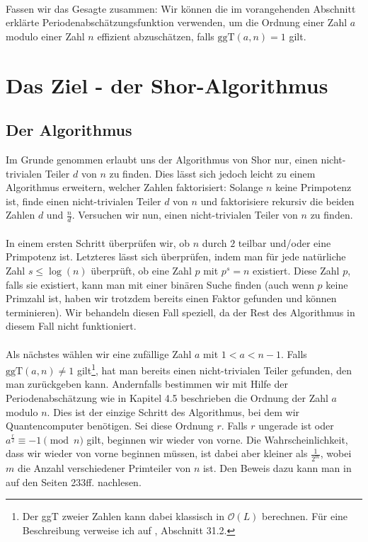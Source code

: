 \paragraph{}
Fassen wir das Gesagte zusammen: Wir können die im vorangehenden Abschnitt erklärte Periodenabschätzungsfunktion verwenden, um die Ordnung einer Zahl $a$ modulo einer Zahl $n$ effizient abzuschätzen, falls $\text{ggT}(a, n) = 1$ gilt.

\section{Das Ziel - der Shor-Algorithmus}
\subsection{Der Algorithmus}
Im Grunde genommen erlaubt uns der Algorithmus von Shor nur, einen nicht-trivialen Teiler $d$ von $n$ zu finden. Dies lässt sich jedoch leicht zu einem Algorithmus erweitern, welcher Zahlen faktorisiert: Solange $n$ keine Primpotenz ist, finde einen nicht-trivialen Teiler $d$ von $n$ und faktorisiere rekursiv die beiden Zahlen $d$ und $\frac{n}{d}$. Versuchen wir nun, einen nicht-trivialen Teiler von $n$ zu finden.

\paragraph{}
In einem ersten Schritt überprüfen wir, ob $n$ durch $2$ teilbar und/oder eine Primpotenz ist. Letzteres lässt sich überprüfen, indem man für jede natürliche Zahl $s \leq \log(n)$ überprüft, ob eine Zahl $p$ mit $p^s = n$ existiert. Diese Zahl $p$, falls sie existiert, kann man mit einer binären Suche finden (auch wenn $p$ keine Primzahl ist, haben wir trotzdem bereits einen Faktor gefunden und können terminieren). Wir behandeln diesen Fall speziell, da der Rest des Algorithmus in diesem Fall nicht funktioniert.
\paragraph{}
Als nächstes wählen wir eine zufällige Zahl $a$ mit $1 < a < n - 1$. Falls $\text{ggT}(a, n) \neq 1$ gilt\footnote{Der ggT zweier Zahlen kann dabei klassisch in $\mathcal O(L)$ berechnen. Für eine Beschreibung verweise ich auf \cite{clrs}, Abschnitt 31.2.}, hat man bereits einen nicht-trivialen Teiler gefunden, den man zurückgeben kann. Andernfalls bestimmen wir mit Hilfe der Periodenabschätzung wie in Kapitel 4.5 beschrieben die Ordnung der Zahl $a$ modulo $n$. Dies ist der einzige Schritt des Algorithmus, bei dem wir Quantencomputer benötigen. Sei diese Ordnung $r$. Falls $r$ ungerade ist oder $a^\frac{r}{2} \equiv -1 \pmod{n}$ gilt, beginnen wir wieder von vorne. Die Wahrscheinlichkeit, dass wir wieder von vorne beginnen müssen, ist dabei aber kleiner als $\frac{1}{2^m}$,  wobei $m$ die Anzahl verschiedener Primteiler von $n$ ist. Den Beweis dazu kann man in \cite{QC} auf den Seiten 233ff. nachlesen.
